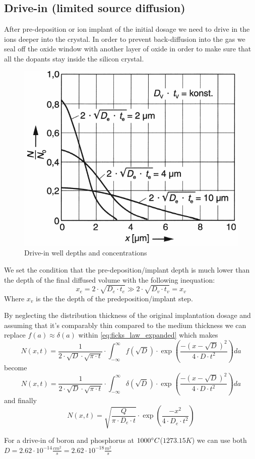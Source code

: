 \subsection{Drive-in (limited source diffusion)}
After pre-deposition or ion implant of the initial dosage we need to drive in the ions deeper into the crystal.
In order to prevent back-diffusion into the gas we seal off the oxide window with another layer of oxide in order to make sure that all the dopants stay inside the silicon crystal.

\begin{figure}[H]
	\centering
	\includegraphics[scale=0.5]{dopants_drive_in_depth.png}
	\caption{Drive-in well depths and concentrations}
\end{figure}

We set the condition that the pre-deposition/implant depth is much lower than the depth of the final diffused volume with the following inequation:
\begin{equation}
x_e = 2 \cdot \sqrt{D_e \cdot t_e} \gg 2 \cdot \sqrt{D_v \cdot t_v} = x_v
\end{equation}
Where $x_v$ is the the depth of the predeposition/implant step.

By neglecting the distribution thickness of the original implantation dosage and assuming that it's comparably thin compared to the medium thickness we can replace  $f(a) \approx \delta(a)$ within \autoref{eq:ficks_law_expanded} which makes
\begin{equation}
N(x,t) = \frac{1}{2 \cdot \sqrt{D} \cdot \sqrt{\pi \cdot t}} \cdot \int_{-\infty}^{\infty}{f(\sqrt{D})\cdot\exp\left(\frac{-(x-\sqrt{D})^2}{4 \cdot D \cdot t^2}\right)}da
\end{equation}
become
\begin{equation}
N(x,t)
=
\frac{1}{2 \cdot \sqrt{D} \cdot \sqrt{\pi \cdot t}} \cdot \int_{-\infty}^{\infty}{\delta(\sqrt{D})\cdot\exp\left(\frac{-(x-\sqrt{D})^2}{4 \cdot D \cdot t^2}\right)}da
\end{equation}
and finally
\begin{equation}
N(x,t)
=
\sqrt{\frac{Q}{\pi \cdot D_e \cdot t}} \cdot \exp\left(\frac{-x^2}{4 \cdot D_e \cdot t^2}\right)
\end{equation}

For a drive-in of boron and phosphorus at $1000\degree C$($1273.15 K$) we can use both $D=2.62 \cdot 10^{-14} \frac{cm^2 }{s}=2.62 \cdot 10^{-18} \frac{m^2 }{s}$
